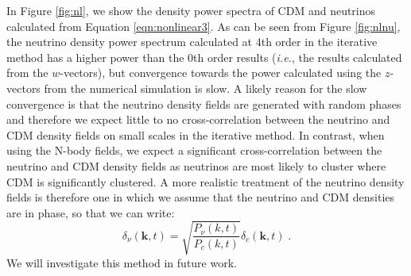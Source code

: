 \documentclass[twocolumn,superscriptaddress,prd]{revtex4}
\def \ie {{\it i.e.}, }
\begin{document}
In Figure \ref{fig:nl}, we show the density power spectra of CDM and
neutrinos calculated from Equation \eqref{eqn:nonlinear3}.
As can be seen from Figure \ref{fig:nlnu}, the neutrino density power
spectrum calculated at 4th order in the iterative method has a
 higher power than the 0th order results (\ie the results
calculated from the $w$-vectors), but convergence towards the power
calculated using the $z$-vectors from the numerical simulation is slow.  
A likely reason for the slow convergence is that the
neutrino density fields are generated with random phases and therefore
we expect little to
no cross-correlation between the neutrino and
CDM density fields on small scales in the iterative method.  In contrast, when using the
N-body fields, we expect a significant cross-correlation
between the neutrino and CDM density fields as 
neutrinos are most likely to cluster where CDM is
significantly clustered.  A more realistic treatment of the neutrino
density fields is therefore one in which we assume that the
neutrino and CDM densities 
are in phase, so that we can write:
\begin{equation}
  \delta_\nu(\mathbf{k},t) = \sqrt{ \frac{ P_\nu(k,t)}{P_c(k,t)} } \delta_c(\mathbf{k},t)\;.
\end{equation}
We will investigate this method in future work.
\end{document}
